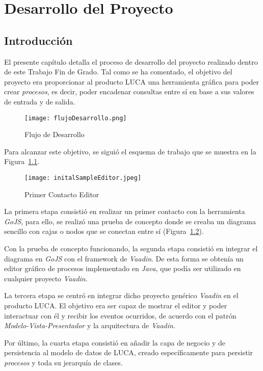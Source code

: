 \chapter{Desarrollo del Proyecto}

\minitoc

\section{Introducción}

El presente capítulo detalla el proceso de desarrollo del proyecto realizado dentro de este Trabajo Fin de Grado. Tal como se ha comentado, el objetivo del proyecto era
proporcionar al producto LUCA una herramienta gráfica para poder crear \emph{procesos}, es decir, poder encadenar consultas entre sí en base a sus valores de entrada y de salida.

\begin{figure}[H]
	\centering
	\texttt{[image: flujoDesarrollo.png]}
	\caption{Flujo de Desarrollo}
	\label{fig:flujoDesarrollo}
\end{figure}

Para alcanzar este objetivo, se siguió el esquema de trabajo que se muestra en la Figura~\ref{fig:flujoDesarrollo}.

\begin{figure}[H]
	\centering
	\texttt{[image: initalSampleEditor.jpeg]}
	\caption{Primer Contacto Editor}
	\label{fig:initialSampleEditor}
\end{figure}

La primera etapa consistió en realizar un primer contacto con la herramienta \emph{GoJS}, para ello, se realizó una prueba de concepto donde se creaba un diagrama sencillo con cajas o nodos que se conectan entre sí (Figura~\ref{fig:initialSampleEditor}).

Con la prueba de concepto funcionando, la segunda etapa consistió en integrar el diagrama en \emph{GoJS} con el framework de \emph{Vaadin}. De esta forma se obtenía un editor gráfico de procesos implementado en \emph{Java}, que podía ser utilizado en cualquier proyecto \emph{Vaadin}.

La tercera etapa se centró en integrar dicho proyecto genérico \emph{Vaadin} en el producto LUCA.  El objetivo era ser capaz de mostrar el editor y poder interactuar con él y recibir los eventos ocurridos, de acuerdo con el patrón \emph{Modelo-Vista-Presentador} y la arquitectura de \emph{Vaadin}.

Por último, la cuarta etapa consistió en añadir la capa de negocio y de persistencia al modelo de datos de LUCA, creado específicamente para persistir \emph{procesos} y toda su jerarquía de clases.

